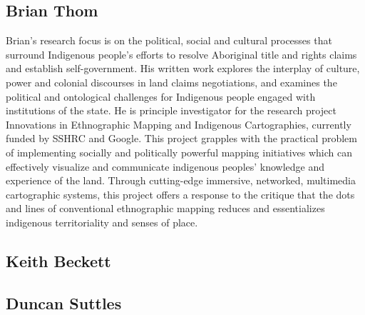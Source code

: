 \subsection*{Brian Thom}
Brian’s research focus is on the political, social and cultural processes that surround Indigenous people's efforts to resolve Aboriginal title and rights claims and establish self-government.  His written work explores the interplay of culture, power and colonial discourses in land claims negotiations, and examines the political and ontological challenges for Indigenous people engaged with institutions of the state.  He is principle investigator for the research project Innovations in Ethnographic Mapping and Indigenous Cartographies, currently funded by SSHRC and Google. This project grapples with the practical problem of implementing socially and politically powerful mapping initiatives which can effectively visualize and communicate indigenous peoples’ knowledge and experience of the land. Through cutting-edge immersive, networked, multimedia cartographic systems, this project offers a response to the critique that the dots and lines of conventional ethnographic mapping reduces and essentializes indigenous territoriality and senses of place.



\subsection*{Keith Beckett}
\subsection*{Duncan Suttles}
